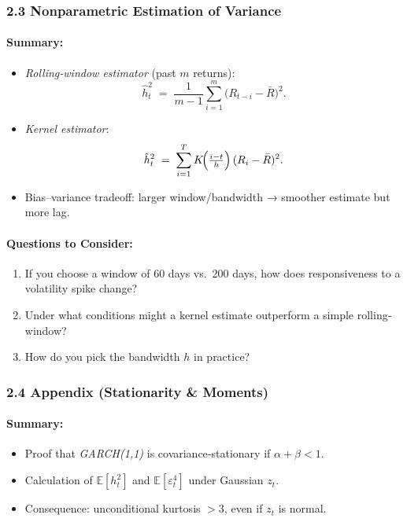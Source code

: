 \documentclass[11pt]{amsart}
\begin{document}
\subsubsection{2.3 Nonparametric Estimation of Variance}
\paragraph{Summary:}
\begin{itemize}[noitemsep,left=0pt]
  \item \emph{Rolling‐window estimator} (past $m$ returns):
    \[
      \hat h_t^2 \;=\; \frac{1}{m - 1}\sum_{i=1}^m \bigl(R_{t-i} - \bar{R}\bigr)^2.
    \]
  \item \emph{Kernel estimator}:
    \[
      \hat h_t^2 \;=\; \sum_{i=1}^T K\!\Bigl(\tfrac{i - t}{h}\Bigr)\,(R_i - \bar{R})^2.
    \]
  \item Bias–variance tradeoff: larger window/bandwidth → smoother estimate but more lag.
\end{itemize}

\paragraph{Questions to Consider:}
\begin{enumerate}[noitemsep,left=0pt]
  \item If you choose a window of 60 days vs.\ 200 days, how does responsiveness to a volatility spike change?
  \item Under what conditions might a kernel estimate outperform a simple rolling‐window?
  \item How do you pick the bandwidth $h$ in practice?
\end{enumerate}

\subsubsection{2.4 Appendix (Stationarity \& Moments)}
\paragraph{Summary:}
\begin{itemize}[noitemsep,left=0pt]
  \item Proof that \emph{GARCH(1,1)} is covariance‐stationary if $\alpha + \beta < 1$.
  \item Calculation of $\mathbb{E}[h_t^2]$ and $\mathbb{E}[\varepsilon_t^4]$ under Gaussian $z_t$.
  \item Consequence: unconditional kurtosis $> 3$, even if $z_t$ is normal.
\end{itemize}
\end{document}
